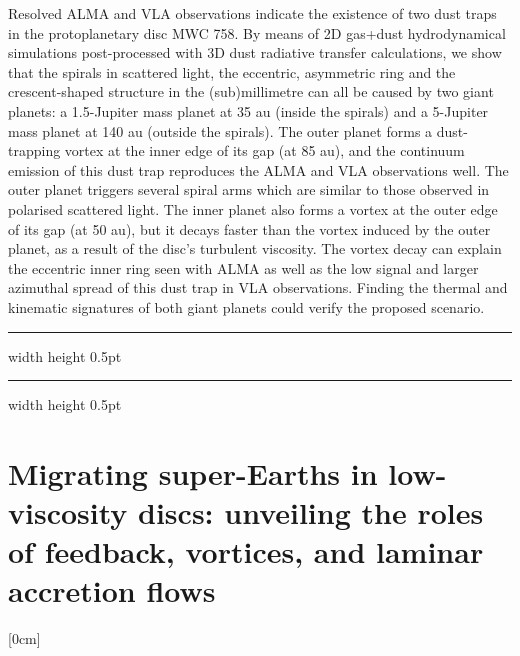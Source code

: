 \documentclass[a4paper,11pt]{book}
\def\doubleline{
\hrule width \hsize height 0.5pt  \kern 1mm \hrule width \hsize height 0.5pt 
}
\begin{document}
  
\vspace{2 mm}
\noindent Resolved ALMA and VLA observations indicate the existence of two dust traps in the protoplanetary disc MWC 758. By means of 2D gas+dust hydrodynamical simulations post-processed with 3D dust radiative transfer calculations, we show that the spirals in scattered light, the eccentric, asymmetric ring and the crescent-shaped structure in the (sub)millimetre can all be caused by two giant planets: a 1.5-Jupiter mass planet at 35 au (inside the spirals) and a 5-Jupiter mass planet at 140 au (outside the spirals). The outer planet forms a dust-trapping vortex at the inner edge of its gap (at 85 au), and the continuum emission of this dust trap reproduces the ALMA and VLA observations well. The outer planet triggers several spiral arms which are similar to those observed in polarised scattered light. The inner planet also forms a vortex at the outer edge of its gap (at 50 au), but it decays faster than the vortex induced by the outer planet, as a result of the disc’s turbulent viscosity. The vortex decay can explain the eccentric inner ring seen with ALMA as well as the low signal and larger azimuthal spread of this dust trap in VLA observations. Finding the thermal and kinematic signatures of both giant planets could verify the proposed scenario.

\noindent\doubleline
        
          \section[Migrating super-Earths in low-viscosity discs: unveiling the roles of feedback, vortices, and laminar accretion flows \newline(Colin P. McNally)] { Migrating super-Earths in low-viscosity discs: unveiling the roles of feedback, vortices, and laminar accretion flows }



[0cm]
\end{document}
